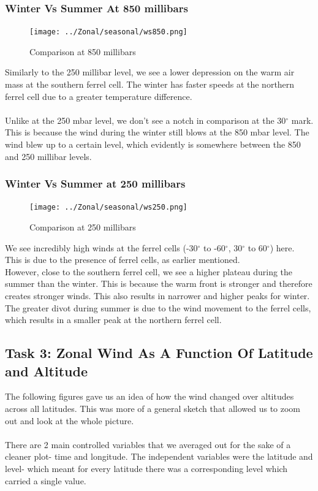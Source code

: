 \documentclass[hidelinks]{article}
\begin{document}
\subsubsection{Winter Vs Summer At 850 millibars}
\begin{figure}[h!]
	\centering
	\texttt{[image: ../Zonal/seasonal/ws850.png]}
	\caption{Comparison at 850 millibars}
\end{figure}
Similarly to the 250 millibar level, we see a lower depression on the warm air mass at the southern ferrel cell. The winter has faster speeds at the northern ferrel cell due to a greater temperature difference. \\\\Unlike at the 250 mbar level, we don't see a notch in comparison at the 30$^\circ$ mark. This is because the wind during the winter still blows at the 850 mbar level. The wind blew up to a certain level, which evidently is somewhere between the 850 and 250 millibar levels. 

\subsubsection{Winter Vs Summer at 250 millibars}
\begin{figure}[h!]
	\centering
	\texttt{[image: ../Zonal/seasonal/ws250.png]}
	\caption{Comparison at 250 millibars}
\end{figure}
\noindent We see incredibly high winds at the ferrel cells (-30$^\circ$ to -60$^\circ$, 30$^\circ$ to 60$^\circ$) here. This is due to the presence of ferrel cells, as earlier mentioned. \\
However, close to the southern ferrel cell, we see a higher plateau during the summer than the winter. This is because the warm front is stronger and therefore creates stronger winds. This also results in narrower and higher peaks for winter. \\
The greater divot during summer is due to the wind movement to the ferrel cells, which results in a smaller peak at the northern ferrel cell.

\newpage
\subsection{Task 3: Zonal Wind As A Function Of Latitude and Altitude}
The following figures gave us an idea of how the wind changed over altitudes across all latitudes. This was more of a general sketch that allowed us to zoom out and look at the whole picture.
\\\\There are 2 main controlled variables that we averaged out for the sake of a cleaner plot- time and longitude.
The independent variables were the latitude and level- which meant for every latitude there was a corresponding level which carried a single value.
\end{document}

